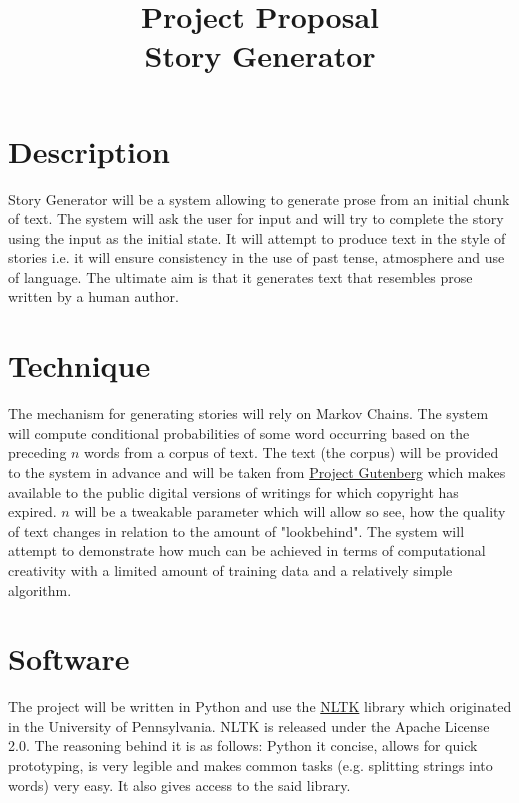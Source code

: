 \documentclass[a4paper, 12pt, notitlepage]{article}
\date{} %
\author{}
\title{Project Proposal \\ Story Generator}
\begin{document}
\maketitle

\pagestyle{empty}

\vspace{-1.5cm}

\section*{Description}

Story Generator will be a system allowing to generate prose from an initial
chunk of text. The system will ask the user for input and will try to complete
the story using the input as the initial state.  It will attempt to produce
text in the style of stories i.e. it will ensure consistency in
the use of past tense, atmosphere and use of language. The ultimate aim is
that it generates text that resembles prose written by a human author.

\section*{Technique}

The mechanism for generating stories will rely on Markov Chains. The system
will compute conditional probabilities of some word occurring
based on the preceding $n$ words from a corpus of text. The text (the
corpus) will be provided to the system in advance and will be taken from
\href{https://www.gutenberg.org/}{Project Gutenberg} which makes available to
the public digital versions of writings for which copyright has expired. $n$
will be a tweakable parameter which will allow so see, how the quality of text
changes in relation to the amount of "lookbehind". The system will attempt
to demonstrate how much can be achieved in terms of computational creativity
with a limited amount of training data and a relatively simple algorithm.

\section*{Software}

The project will be written in Python and use the
\href{http://www.nltk.org/}{NLTK} library which originated in the University
of Pennsylvania. NLTK is released under the Apache License 2.0.
The reasoning behind it is as follows: Python it concise, allows for quick
prototyping, is very legible and makes common tasks (e.g. splitting strings
into words) very easy. It also gives access to the said library.
\end{document}
